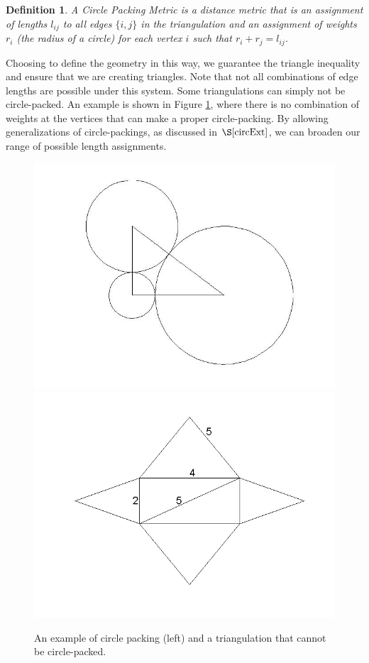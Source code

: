 \documentclass[12pt]{article}
\newtheorem{definition}[theorem]{Definition}
\begin{document}
\begin{definition}
A Circle Packing Metric is a distance metric that is an assignment of lengths $l_{ij}$ to all edges $\{i, j\}$ in the triangulation and an assignment of weights $r_i$ (the radius of a circle) for each vertex $i$ such that $r_i + r_j = l_{ij}$. 
\end{definition}

 Choosing to define the geometry in this way, we guarantee the triangle inequality and ensure that we are creating triangles. Note that not all combinations of edge lengths are possible under this system. Some triangulations can simply not be circle-packed. An example is shown in Figure \ref{rightTri}, where there is no combination of weights at the vertices that can make a proper circle-packing. By allowing generalizations of circle-packings, as discussed in $\S\ref{circExt}$, we can broaden our range of possible length assignments.

  
\begin{figure}
\includegraphics[scale = 0.3]{Pictures/righttriangulation.jpg}
\includegraphics[scale = 0.5]{Pictures/badcase2.png}
\caption{An example of circle packing (left) and a triangulation that cannot be circle-packed.}
\label{rightTri}
\end{figure}
\end{document}
